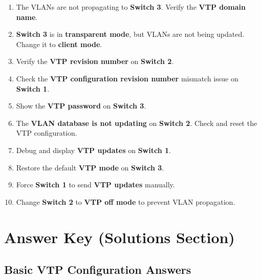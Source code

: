 \documentclass[a4paper]{book}
\begin{document}
\begin{enumerate}
    \item The VLANs are not propagating to \textbf{Switch 3}. Verify the \textbf{VTP domain name}.
    \item \textbf{Switch 3} is in \textbf{transparent mode}, but VLANs are not being updated. Change it to \textbf{client mode}.
    \item Verify the \textbf{VTP revision number} on \textbf{Switch 2}.
    \item Check the \textbf{VTP configuration revision number} mismatch issue on \textbf{Switch 1}.
    \item Show the \textbf{VTP password} on \textbf{Switch 3}.
    \item The \textbf{VLAN database is not updating} on \textbf{Switch 2}. Check and reset the VTP configuration.
    \item Debug and display \textbf{VTP updates} on \textbf{Switch 1}.
    \item Restore the default \textbf{VTP mode} on \textbf{Switch 3}.
    \item Force \textbf{Switch 1} to send \textbf{VTP updates} manually.
    \item Change \textbf{Switch 2} to \textbf{VTP off mode} to prevent VLAN propagation.
\end{enumerate}
\newpage

\chapter{Answer Key (Solutions Section)}
\section{Basic VTP Configuration Answers}
\end{document}

